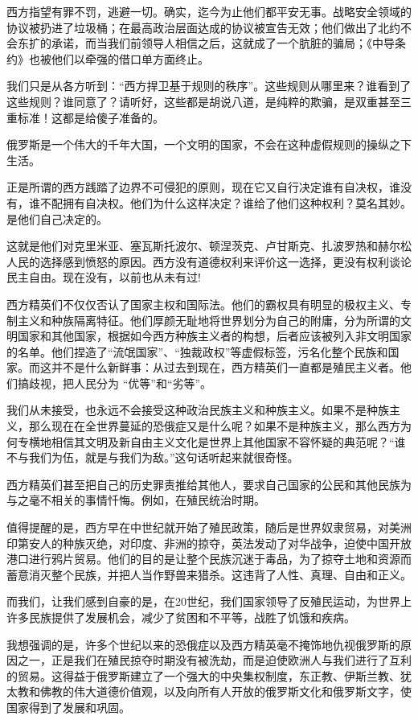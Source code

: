 \documentclass[UTF8, 11pt, oneside]{ctexart}
\begin{document}
西方指望有罪不罚，逃避一切。确实，迄今为止他们都平安无事。战略安全领域的协议被扔进了垃圾桶；在最高政治层面达成的协议被宣告无效；他们做出了北约不会东扩的承诺，而当我们前领导人相信之后，这就成了一个肮脏的骗局；《中导条约》也被他们以牵强的借口单方面终止。

我们只是从各方听到：“西方捍卫基于规则的秩序”。这些规则从哪里来？谁看到了这些规则？谁同意了？请听好，这些都是胡说八道，是纯粹的欺骗，是双重甚至三重标准！这都是给傻子准备的。

俄罗斯是一个伟大的千年大国，一个文明的国家，不会在这种虚假规则的操纵之下生活。

正是所谓的西方践踏了边界不可侵犯的原则，现在它又自行决定谁有自决权，谁没有，谁不配拥有自决权。他们为什么这样决定？谁给了他们这种权利？莫名其妙。是他们自己决定的。

这就是他们对克里米亚、塞瓦斯托波尔、顿涅茨克、卢甘斯克、扎波罗热和赫尔松人民的选择感到愤怒的原因。西方没有道德权利来评价这一选择，更没有权利谈论民主自由。现在没有，以前也从未有过!

西方精英们不仅仅否认了国家主权和国际法。他们的霸权具有明显的极权主义、专制主义和种族隔离特征。他们厚颜无耻地将世界划分为自己的附庸，分为所谓的文明国家和其他国家，根据如今西方种族主义者的构想，后者应该被列入非文明国家的名单。他们捏造了“流氓国家”、“独裁政权”等虚假标签，污名化整个民族和国家。而这并不是什么新鲜事：从过去到现在，西方精英们一直都是殖民主义者。他们搞歧视，把人民分为 “优等”和“劣等”。

我们从未接受，也永远不会接受这种政治民族主义和种族主义。如果不是种族主义，那么现在在全世界蔓延的恐俄症又是什么呢？如果不是种族主义，那么西方为何专横地相信其文明及新自由主义文化是世界上其他国家不容怀疑的典范呢？“谁不与我们为伍，就是与我们为敌。”这句话听起来就很奇怪。

西方精英们甚至把自己的历史罪责推给其他人，要求自己国家的公民和其他民族为与之毫不相关的事情忏悔。例如，在殖民统治时期。

值得提醒的是，西方早在中世纪就开始了殖民政策，随后是世界奴隶贸易，对美洲印第安人的种族灭绝，对印度、非洲的掠夺，英法发动了对华战争，迫使中国开放港口进行鸦片贸易。他们的目的是让整个民族沉迷于毒品，为了掠夺土地和资源而蓄意消灭整个民族，并把人当作野兽来猎杀。这违背了人性、真理、自由和正义。

而我们，让我们感到自豪的是，在20世纪，我们国家领导了反殖民运动，为世界上许多民族提供了发展机会，减少了贫困和不平等，战胜了饥饿和疾病。

我想强调的是，许多个世纪以来的恐俄症以及西方精英毫不掩饰地仇视俄罗斯的原因之一，正是我们在殖民掠夺时期没有被洗劫，而是迫使欧洲人与我们进行了互利的贸易。这得益于俄罗斯建立了一个强大的中央集权制度，东正教、伊斯兰教、犹太教和佛教的伟大道德价值观，以及向所有人开放的俄罗斯文化和俄罗斯文字，使国家得到了发展和巩固。
\end{document}
